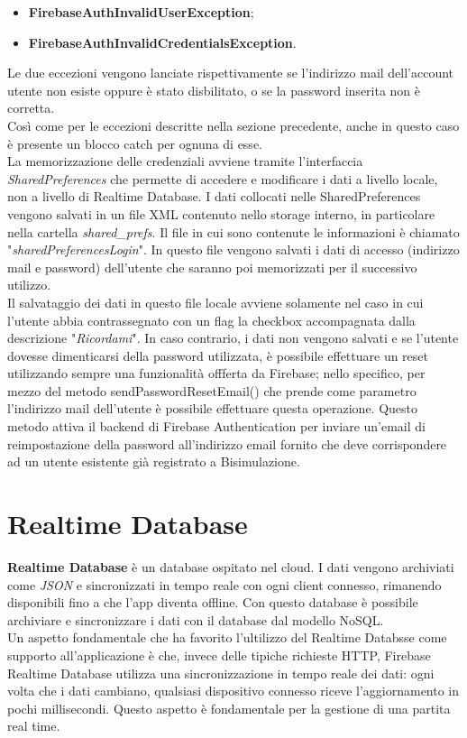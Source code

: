 \documentclass[a4paper,12pt,twoside,openright]{report}
\begin{document}
\begin{itemize}
\item \textbf{FirebaseAuthInvalidUserException};

\item \textbf{FirebaseAuthInvalidCredentialsException}.
\end{itemize}

Le due eccezioni vengono lanciate rispettivamente se l'indirizzo mail dell'account utente non esiste oppure è stato disbilitato, o se la password inserita non è corretta.\\
Così come per le eccezioni descritte nella sezione precedente, anche in questo caso è presente un blocco catch per ognuna di esse.\\
La memorizzazione delle credenziali avviene tramite l'interfaccia \textit{SharedPreferences} che permette di accedere e modificare i dati a livello locale, non a livello di Realtime Database.
I dati collocati nelle SharedPreferences vengono salvati in un file XML contenuto nello storage interno, in particolare nella cartella \textit{shared\_prefs}. Il file in cui sono contenute le informazioni è chiamato "\textit{sharedPreferencesLogin}". In questo file vengono salvati i dati di accesso (indirizzo mail e password) dell'utente che saranno poi memorizzati per il successivo utilizzo.\\
Il salvataggio dei dati in questo file locale avviene solamente nel caso in cui l'utente abbia contrassegnato con un flag la checkbox accompagnata dalla descrizione "\textit{Ricordami}". In caso contrario, i dati non vengono salvati e se l'utente dovesse dimenticarsi della password utilizzata, è possibile effettuare un reset utilizzando sempre una funzionalità offferta da Firebase; nello specifico, per mezzo del metodo sendPasswordResetEmail() che prende come parametro l'indirizzo mail dell'utente è possibile effettuare questa operazione. Questo metodo attiva il backend di Firebase Authentication per inviare un'email di reimpostazione della password all'indirizzo email fornito che deve corrispondere ad un utente esistente già registrato a Bisimulazione.

\section{Realtime Database}
\textbf{Realtime Database} è un database ospitato nel cloud. I dati vengono archiviati come \textit{JSON} e sincronizzati in tempo reale con ogni client connesso, rimanendo disponibili fino a che l'app diventa offline. Con questo database è possibile archiviare e sincronizzare i dati con il database dal modello NoSQL.\\
Un aspetto fondamentale che ha favorito l'ultilizzo del Realtime Databsse come supporto all'applicazione è che, invece delle tipiche richieste HTTP, Firebase Realtime Database utilizza una sincronizzazione in tempo reale dei dati: ogni volta che i dati cambiano, qualsiasi dispositivo connesso riceve l'aggiornamento in pochi millisecondi. Questo aspetto è fondamentale per la gestione di una partita real time.\\
\end{document}
